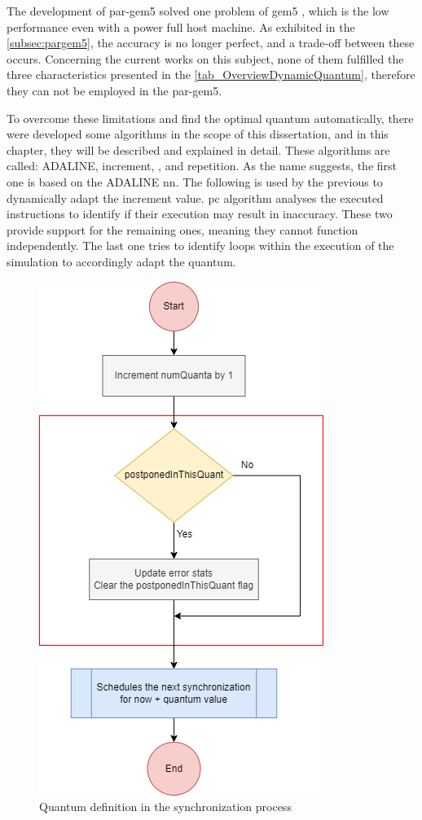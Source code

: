 
% 

The development of par-gem5 \cite{pargem5} solved one problem of gem5 \cite{TheGem5Simulator}, which is the low performance even with a power full host machine. As exhibited in the \autoref{subsec:pargem5}, the accuracy is no longer perfect, and a trade-off between these occurs. Concerning the current works on this subject, none of them fulfilled the three characteristics presented in the \autoref{tab_OverviewDynamicQuantum}, therefore they can not be employed in the par-gem5. 

To overcome these limitations and find the optimal quantum automatically, there were developed some algorithms in the scope of this dissertation, and in this chapter, they will be described and explained in detail. These algorithms are called: ADALINE, increment, , and repetition. As the name suggests, the first one is based on the ADALINE \gls{nn}. The following is used by the previous to dynamically adapt the increment value. \gls{pc} algorithm analyses the executed instructions to identify if their execution may result in inaccuracy. These two provide support for the remaining ones, meaning they cannot function independently. The last one tries to identify loops within the execution of the simulation to accordingly adapt the quantum.  

\begin{figure}[H]
	\centering
 	\includegraphics[width=0.5\linewidth]{Images/GlobalSyncEventStatic.png}
 	\caption{Quantum definition in the synchronization process}
	 \label{fig_GlobalSyncEventStatic}
\end{figure}


